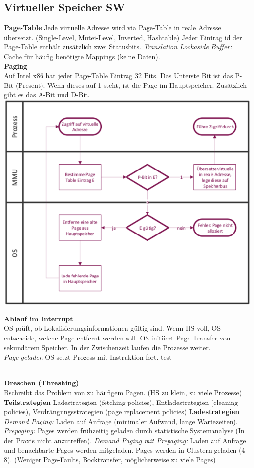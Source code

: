 \documentclass[7pt,landscape,a4paper]{scrartcl}
\begin{document}
\begin{multicols*}{4}
\subsection{Virtueller Speicher SW}
\vspace{-0.75em}
\textbf{Page-Table} Jede virtuelle Adresse wird via Page-Table in reale Adresse übersetzt. (Single-Level, Mutei-Level, Inverted, Hashtable) Jeder Eintrag id der Page-Table enthält zusätzlich zwei Statusbits. \textit{Translation Lookaside Buffer:} Cache für häufig benötigte Mappings (keine Daten).\\
\textbf{Paging}\\
Auf Intel x86 hat jeder Page-Table Eintrag 32 Bits. Das Unterste Bit ist das P-Bit (Present). Wenn dieses auf 1 steht, ist die Page im Hauptspeicher.  Zusätzlich gibt es das A-Bit und D-Bit.\\
\includegraphics[width=0.6\linewidth]{paging}
\begin{minipage}[b]{0,4\linewidth}
\textbf{Ablauf im Interrupt}\\
OS prüft, ob Lokalisierungsinformationen gültig sind. Wenn HS voll, OS entscheide, welche Page entfernt werden soll. OS initiiert Page-Transfer von sekundärem Speicher. In der Zwischenzeit laufen die Prozesse weiter.\\
\textit{Page geladen} OS setzt Prozess mit Instruktion fort.
test
\end{minipage}\\
\textbf{Dreschen (Threshing)}\\
Bschreibt das Problem von zu häufigem Pagen. (HS zu klein, zu viele Prozesse)\\
\textbf{Teilstrategien} Ladestrategien (fetching policies), Entladestrategien (cleaning policies), Verdrängungsstrategien (page replacement policies)
\textbf{Ladestrategien} \textit{Demand Paging:} Laden auf Anfrage (minimaler Aufwand, lange Wartezeiten). \textit{Prepaging:} Pages werden frühzeitig geladen durch statistische Systemanalyse (In der Praxis nicht anzutreffen). \textit{Demand Paging mit Prepaging:} Laden auf Anfrage und benachbarte Pages werden mitgeladen. Pages werden in Clustern geladen (4-8). (Weniger Page-Faults, Bocktransfer, möglicherweise zu viele Pages)\\

\end{multicols*}
\end{document}
